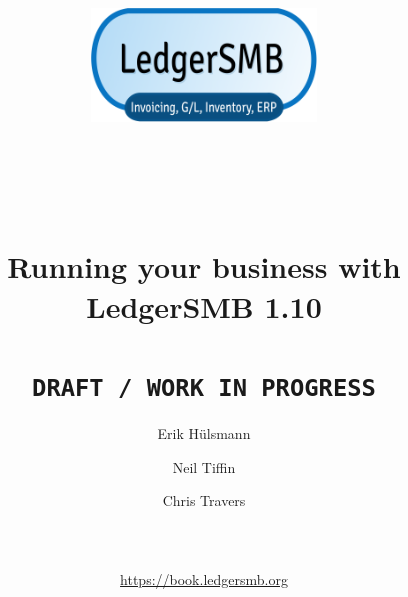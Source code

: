 \documentclass[10pt,a4paper]{book}
\newcommand{\ledgerSMBversion}{1.10 }
\begin{document}
\author{Erik H\"ulsmann \and Neil Tiffin \and Chris Travers \\
~ \\
~ \\
~ \\
 \url{https://book.ledgersmb.org}
} 

\title{
\includegraphics[width=0.45\textwidth]{NewLedgerSMBLogo512x256.png}\\
	~ \\
	~ \\
	~ \\
	Running your business with\\
	{\Huge LedgerSMB \ledgerSMBversion} \\
	~ \\
	\texttt{DRAFT / WORK IN PROGRESS} \\
}
\maketitle

%	
%	
%	
\end{document}
